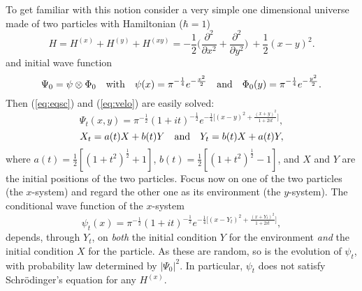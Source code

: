 \documentclass[12pt]{article}
\newcommand{\Sc}{Schr\"{o}dinger}
\newcommand{\wf}{wave function}
\newcommand{\ot}{\otimes}
\begin{document}
To get familiar with this notion consider a very simple one
dimensional universe made of two particles with Hamiltonian
($\hbar=1$)
%
\begin{displaymath}
H =H^{(x)}+H^{(y)} +H^{(xy)} = -\frac{1}{2}\big(
\frac{\partial^2}{\partial x^2} + \frac{\partial^2}{\partial
y^2}\big) \ + \frac{1}{2} (x-y)^2 .
\end{displaymath}
%
and initial \wf{}
%
\begin{displaymath}
\Psi_0 = \psi \ot \Phi_0 \quad\hbox{with}\quad
\psi(x)=\pi^{-\frac{1}{4}} e^{-\frac{x^2}{2}}\quad\hbox{and}\quad
\Phi_0 (y)=\pi^{-\frac{1}{4}} e^{-\frac{y^2}{2}}.
\end{displaymath}
%
Then (\ref{eq:eqsc}) and (\ref{eq:velo}) are easily solved:
%
\begin{displaymath}
\Psi_t (x,y) =\pi^{-\frac{1}{2}} (1+it)^{-\frac{1}{2}}
e^{-\frac{1}{4}\big[(x- y)^2+\frac{(x+y)^2}{1+2it}\big]},
\end{displaymath}
\begin{displaymath}
X_t = a(t)X + b(t)Y \quad\hbox{and}\quad Y_t = b(t)X +a(t) Y ,
\end{displaymath}
%
where $a(t)= \frac{1}{2}[ (1+t^2)^{\frac{1}{2}}+1] $, $b(t)=
\frac{1}{2}[ (1+t^2)^{\frac{1}{2}}-1] $, and $X$ and $Y$ are the
initial positions of the two particles.  Focus now on one of the two
particles (the $x$-system) and regard the other one as its environment
(the $y$-system).  The conditional \wf{} of the $x$-system
%
\begin{displaymath}
\psi_t(x) = \pi^{-\frac{1}{2}} (1+it)^{-\frac{1}{2}}
e^{-\frac{1}{4}\big[(x- Y_{t})^2+\frac{(x+Y_{t})^2}{1+2it}\big]},
\end{displaymath}
%
depends, through $Y_t$, on \emph{both} the initial condition $Y$ for
the environment \emph{and} the initial condition $X$ for the particle.
As these are random, so is the evolution of $\psi_t$, with probability
law determined by $|\Psi_0|^2$.  In particular, $\psi_t$ does not
satisfy \Sc's equation for any $H^{(x)}$.
\end{document}
